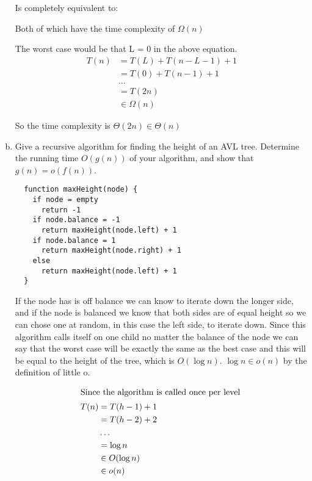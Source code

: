 \documentclass[12pt]{article}
\begin{document}
\begin{enumerate}[(a)]
Is completely equivalent to:


Both of which have the time complexity of $\Omega(n)$

The worst case would be that L = 0 in the above equation.
\begin{align*}
      T(n) &= T(L) + T(n-L-1) + 1\\
        &= T(0) + T(n-1) + 1\\
        & \dots\\
        &= T(2n)\\
        &\in\Omega(n)
\end{align*}

So the time complexity is $\Theta(2n)\in\Theta(n)$
\item Give a recursive algorithm for finding the height of an AVL tree. Determine the running time
$O(g(n))$ of your algorithm, and show that $g(n) = o(f(n))$.

\begin{verbatim}
  function maxHeight(node) {
    if node = empty
      return -1
    if node.balance = -1
      return maxHeight(node.left) + 1
    if node.balance = 1
      return maxHeight(node.right) + 1
    else
      return maxHeight(node.left) + 1
  }
\end{verbatim}

If the node has is off balance we can know to iterate down the longer side, and if the node is balanced we know that both sides are of equal height so we can chose one at random, in this case the left side, to iterate down. Since this algorithm calls itself on one child no matter the balance of the node we can say that the worst case will be exactly the same as the best case and this will be equal to the height of the tree, which is $O(\log n)$. $\log n \in o(n)$  by the definition of little o.

\begin{align*}
    \intertext{Since the algorithm is called once per level }
    T(n) &= T(h-1) + 1\\
     &= T(h-2) + 2 \\
     & \dots\\
     &= \log n\\
     &\in O(\log n)\\
     &\in o(n)
\end{align*}


\end{enumerate}
\end{document}
